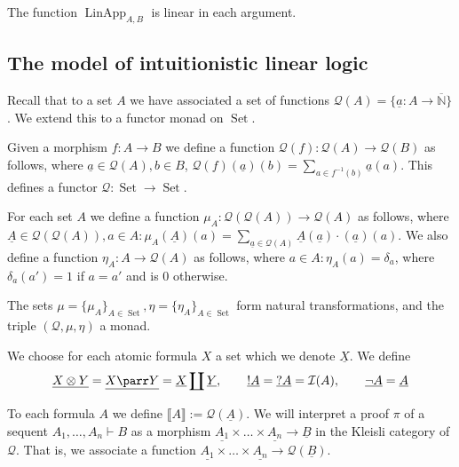 \documentclass[runningheads]{llncs}
\newcommand{\bb}[1]{\mathbb{#1}}
\newcommand{\call}[1]{\mathcal{#1}}
\newcommand{\Ical}{\call{I}}
\newcommand{\Qcal}{\call{Q}}
\newcommand{\lto}{\longrightarrow}
\DeclareMathOperator{\set}{Set}
\begin{document}
\begin{lemma}
The function $\operatorname{LinApp}_{A,B}$ is linear in each argument.
\end{lemma}

\subsection{The model of intuitionistic linear logic}
Recall that to a set $A$ we have associated a set of functions $\Qcal(A) = \{ \underline{a}: A\lto \overline{\bb{N}}\}$. We extend this to a functor monad on $\set$.
\begin{definition}\label{def:Q_monad}
    Given a morphism $f: A \lto B$ we define a function $\Qcal(f): \Qcal(A) \lto \Qcal(B)$ as follows, where $\underline{a} \in \Qcal(A), b \in B$, $\Qcal(f)(\underline{a})(b) = \sum_{a \in f^{-1}(b)}\underline{a}(a)$. This defines a functor $\Qcal: \set \lto \set$.

    For each set $A$ we define a function $\mu_A: \Qcal(\Qcal(A)) \lto \Qcal(A)$ as follows, where $\underline{A} \in \Qcal(\Qcal(A)), a \in A: \mu_A(\underline{A})(a) = \sum_{\underline{a} \in \Qcal(A)}\underline{A}(\underline{a})\cdot(\underline{a})(a)$. We also define a function $\eta_A: A \lto \Qcal(A)$ as follows, where $a \in A: \eta_A(a) = \delta_a$, where $\delta_a(a') = 1$ if $a = a'$ and is 0 otherwise.
\end{definition}
\begin{lemma}
    The sets $\mu = \{ \mu_A \}_{A \in \set}, \eta = \{ \eta_A\}_{A \in \set}$ form natural transformations, and the triple $(\Qcal, \mu, \eta)$ a monad.
\end{lemma}
\begin{definition}
We choose for each atomic formula $X$ a set which we denote $\underline{X}$. We define
\begin{equation}
\underline{X \otimes Y} = \underline{X \parr Y} = \underline{X} \coprod \underline{Y},\qquad \underline{! A} = \underline{? A} = \Ical(A),\qquad \underline{\neg A} = \underline{A}
\end{equation}
\end{definition}
To each formula $A$ we define $\llbracket A \rrbracket := \Qcal(\underline{A})$. We will interpret a proof $\pi$ of a sequent $A_1, \ldots, A_n \vdash B$ as a morphism $\underline{A_1} \times \ldots \times \underline{A_n} \lto \underline{B}$ in the Kleisli category of $\Qcal$. That is, we associate a function $\underline{A_1} \times \ldots \times \underline{A_n} \lto \Qcal(\underline{B})$.
	
\end{document}
